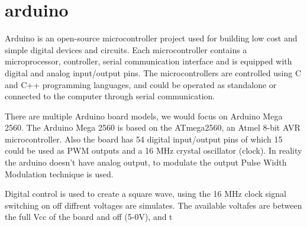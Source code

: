 \documentclass[\main/master.tex]{subfiles}
\begin{document}
\chapter{arduino}\label{chp:example-1}
\doublespacing
Arduino is an open-source microcontroller project used for building low cost and simple digital devices and circuits. Each microcontroller contains a microprocessor, controller, serial communication interface and is equipped with digital and analog input/output pins. The microcontrollers are controlled using C and C++ programming languages, and could be operated as standalone or connected to the computer through serial communication. 
\par
There are multiple Arduino board models, we would focus on Arduino Mega 2560. The Arduino Mega 2560 is based on the ATmega2560, an Atmel 8-bit AVR microcontroller. Also the board has 54 digital input/output pins of which 15 could be used as PWM outputs and a 16 MHz crystal oscillator (clock). In reality the arduino doesn't have analog output, to modulate the output Pulse Width Modulation technique is used.
\par
Digital control is used to create a square wave, using the 16 MHz clock signal switching on off diffrent voltages are simulates. The available voltafes are between the full Vcc of the board and off (5-0V), and t


\iffalse
\color{blue}
\par


 Digital control is used to create a square wave, a signal switched between on and off. This on-off pattern can simulate voltages in between the full Vcc of the board (e.g., 5 V on Uno, 3.3 V on a MKR board) and off (0 Volts) by changing the portion of the time the signal spends on versus the time that the signal spends off. The duration of "on time" is called the pulse width. To get varying analog values, you change, or modulate, that pulse width. If you repeat this on-off pattern fast enough with an LED for example, the result is as if the signal is a steady voltage between 0 and Vcc controlling the brightness of the LED.

In the graphic below, the green lines represent a regular time period. This duration or period is the inverse of the PWM frequency. In other words, with Arduino's PWM frequency at about 500Hz, the green lines would measure 2 milliseconds each. A call to analogWrite() is on a scale of 0 - 255, such that analogWrite(255) requests a 100%



\fi
\end{document}
